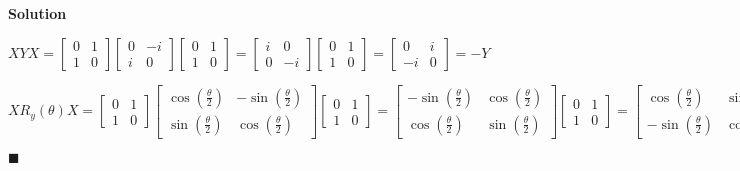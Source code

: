 \documentclass{article}
\begin{document}
\textbf{Solution}

$XYX =
  \begin{bmatrix}0 & 1 \\ 1 & 0\end{bmatrix}
  \begin{bmatrix}0 & -i \\ i & 0\end{bmatrix}
  \begin{bmatrix}0 & 1 \\ 1 & 0\end{bmatrix} = 
  \begin{bmatrix}i & 0 \\ 0 & -i \end{bmatrix}
  \begin{bmatrix}0 & 1 \\ 1 & 0\end{bmatrix} = 
  \begin{bmatrix}0 & i \\ -i & 0\end{bmatrix} = -Y
$

$
X R_{y}(\theta)X = 
\begin{bmatrix}0 & 1 \\ 1 & 0\end{bmatrix}
\begin{bmatrix}
  \cos{(\frac{\theta}{2})} & -\sin{(\frac{\theta}{2})} \\
  \sin{(\frac{\theta}{2})} & \cos{(\frac{\theta}{2})}
\end{bmatrix}
\begin{bmatrix}0 & 1 \\ 1 & 0\end{bmatrix} =
\begin{bmatrix}
  -\sin{(\frac{\theta}{2})} & \cos{(\frac{\theta}{2})} \\
  \cos{(\frac{\theta}{2})} & \sin{(\frac{\theta}{2})}
\end{bmatrix}
\begin{bmatrix}0 & 1 \\ 1 & 0\end{bmatrix} =
\begin{bmatrix}
  \cos{(\frac{\theta}{2})} & \sin{(\frac{\theta}{2})} \\
  -\sin{(\frac{\theta}{2})} & \cos{(\frac{\theta}{2})}
\end{bmatrix} = R_{y}(-\theta)
$

$\blacksquare$

\end{document}
